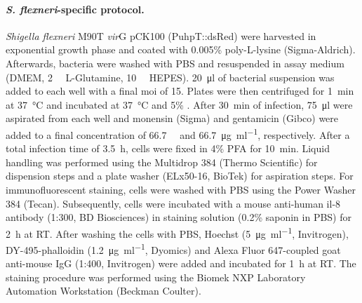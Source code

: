 \paragraph{\textit{S. flexneri}-specific protocol.}
\textit{Shigella flexneri} M90T \textDelta\textit{vir}G pCK100 (PuhpT::dsRed) were harvested in exponential growth phase and coated with 0.005\% poly-L-lysine (Sigma-Aldrich). Afterwards, bacteria were washed with PBS and resuspended in assay medium (DMEM, \SI{2}{\milli\Molar} L-Glutamine, \SI{10}{\milli\Molar} HEPES). \SI{20}{\micro\litre} of bacterial suspension was added to each well with a final \gls{moi} of 15. Plates were then centrifuged for \SI{1}{\minute} at \SI{37}{\celsius} and incubated at \SI{37}{\celsius} and 5\% . After \SI{30}{\minute} of infection, \SI{75}{\micro\litre} were aspirated from each well and monensin (Sigma) and gentamicin (Gibco) were added to a final concentration of \SI{66.7}{\micro\Molar} and \SI{66.7}{\micro\gram\per\milli\litre}, respectively. After a total infection time of \SI{3.5}{\hour}, cells were fixed in 4\% PFA for \SI{10}{\minute}. Liquid handling was performed using the Multidrop 384 (Thermo Scientific) for dispension steps and a plate washer (ELx50-16, BioTek) for aspiration steps. For immunofluorescent staining, cells were washed with PBS using the Power Washer 384 (Tecan). Subsequently, cells were incubated with a mouse anti-human \gls{il-8} antibody (1:300, BD Biosciences) in staining solution (0.2\% saponin in PBS) for \SI{2}{\hour} at RT. After washing the cells with PBS, Hoechst (\SI{5}{\micro\gram\per\milli\litre}, Invitrogen), DY-495-phalloidin (\SI{1.2}{\micro\gram\per\milli\litre}, Dyomics) and Alexa Fluor 647-coupled goat anti-mouse IgG (1:400, Invitrogen) were added and incubated for \SI{1}{\hour} at RT. The staining procedure was performed using the Biomek NXP Laboratory Automation Workstation (Beckman Coulter).

